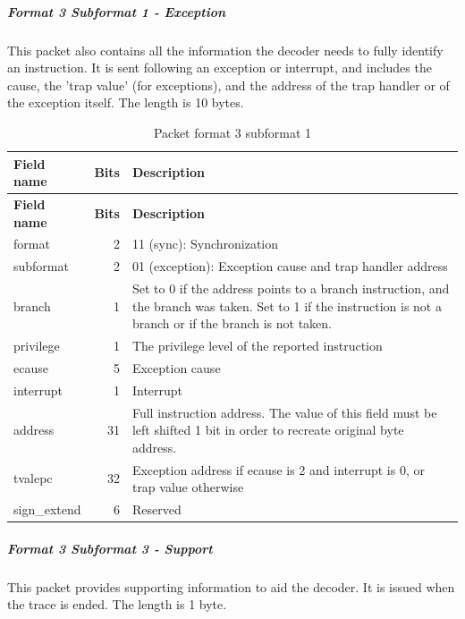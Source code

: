 \documentclass[main\_\_EN.tex]{subfiles}
\begin{document}
\subparagraph{Format 3 Subformat 1 - Exception}
This packet also contains all the information the decoder needs to fully identify an instruction.  It
is sent following an exception or interrupt, and includes the cause, the 'trap value' (for exceptions),
and the address of the trap handler or of the exception itself. The length is 10 bytes.

\begin{longtable}[c]{ |l|r|L{10cm}| }
    \caption{Packet format 3 subformat 1}
    \label{tab:f3s1}
    \\\hline{}
    \textbf{Field name} & \textbf{Bits} & \textbf{Description} \\\hline
    \endfirsthead
    \textbf{Field name} & \textbf{Bits} & \textbf{Description} \\\hline
    \endhead
    \endfoot
    \endlastfoot

    format & 2 & 11 (sync): Synchronization \\\hline
    subformat & 2 & 01 (exception): Exception cause and trap handler address \\\hline
    branch & 1 & Set to 0 if the address points to a branch instruction, and the branch was taken. Set to 1 if the instruction is not a branch or if the branch is not taken. \\\hline
    privilege & 1 & The privilege level of the reported instruction \\\hline
    ecause & 5 & Exception cause \\\hline
    interrupt & 1 & Interrupt \\\hline
    address & 31 & Full instruction address. The value of this field must be left shifted 1 bit in order to recreate original byte address. \\\hline
    tvalepc & 32 & Exception address if ecause is 2 and interrupt is 0, or trap value otherwise \\\hline
    sign\_extend & 6 & Reserved \\\hline
 \end{longtable}



\subparagraph{Format 3 Subformat 3 - Support}

This packet provides supporting information to aid the decoder. It is issued when the trace is ended. The length is 1 byte.
\end{document}
